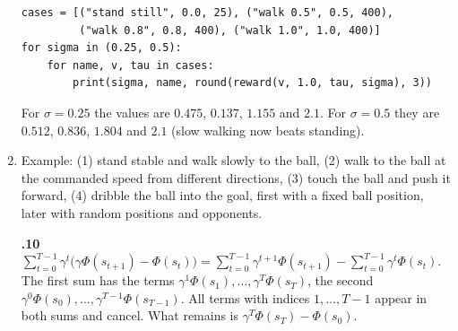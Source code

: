 \begin{enumerate}[label=\textbf{\ansnum.\arabic*}]
\begin{verbatim}
cases = [("stand still", 0.0, 25), ("walk 0.5", 0.5, 400),
         ("walk 0.8", 0.8, 400), ("walk 1.0", 1.0, 400)]
for sigma in (0.25, 0.5):
    for name, v, tau in cases:
        print(sigma, name, round(reward(v, 1.0, tau, sigma), 3))
\end{verbatim}
  For $\sigma=0.25$ the values are $0.475$, $0.137$, $1.155$ and $2.1$. For $\sigma=0.5$ they are $0.512$, $0.836$, $1.804$ and $2.1$ (slow walking now beats standing).
  \item Example: (1) stand stable and walk slowly to the ball, (2) walk to the ball at the commanded speed from different directions, (3) touch the ball and push it forward, (4) dribble the ball into the goal, first with a fixed ball position, later with random positions and opponents.
  \item[\textbf{\ansnum.10}] $\sum_{t=0}^{T-1}\gamma^t\bigl(\gamma\Phi(s_{t+1})-\Phi(s_t)\bigr)=\sum_{t=0}^{T-1}\gamma^{t+1}\Phi(s_{t+1})-\sum_{t=0}^{T-1}\gamma^t\Phi(s_t)$. The first sum has the terms $\gamma^1\Phi(s_1),\dots,\gamma^T\Phi(s_T)$, the second $\gamma^0\Phi(s_0),\dots,\gamma^{T-1}\Phi(s_{T-1})$. All terms with indices $1,\dots,T-1$ appear in both sums and cancel. What remains is $\gamma^T\Phi(s_T)-\Phi(s_0)$.
\end{enumerate}
